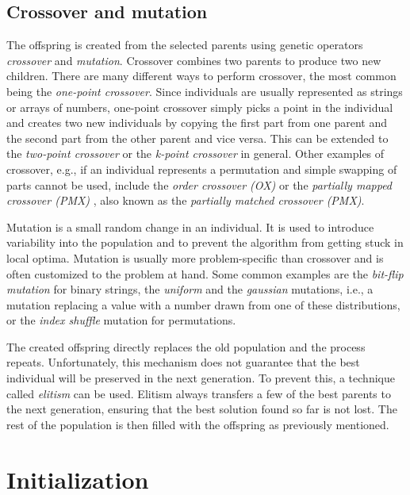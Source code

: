 \subsection{Crossover and mutation}

The offspring is created from the selected parents using genetic operators \textit{crossover} and \textit{mutation}. Crossover combines two parents to produce two new children. There are many different ways to perform crossover, the most common being the \textit{one-point crossover}. Since individuals are usually represented as strings or arrays of numbers, one-point crossover simply picks a point in the individual and creates two new individuals by copying the first part from one parent and the second part from the other parent and vice versa. This can be extended to the \textit{two-point crossover} or the \textit{k-point crossover} in general. Other examples of crossover, e.g., if an individual represents a permutation and simple swapping of parts cannot be used, include the \textit{order crossover (OX)} or the \textit{partially mapped crossover (PMX)} \cite{vanneschi2023lectures}, also known as the \textit{partially matched crossover (PMX)}.

Mutation is a small random change in an individual. It is used to introduce variability into the population and to prevent the algorithm from getting stuck in local optima. Mutation is usually more problem-specific than crossover and is often customized to the problem at hand. Some common examples are the \textit{bit-flip mutation} for binary strings, the \textit{uniform} and the \textit{gaussian} mutations, i.e., a mutation replacing a value with a number drawn from one of these distributions, or the \textit{index shuffle} mutation for permutations.

\bigskip

The created offspring directly replaces the old population and the process repeats. Unfortunately, this mechanism does not guarantee that the best individual will be preserved in the next generation. To prevent this, a technique called \textit{elitism} can be used. Elitism always transfers a few of the best parents to the next generation, ensuring that the best solution found so far is not lost. The rest of the population is then filled with the offspring as previously mentioned.

\section{Initialization} \label{sec:initialization}

